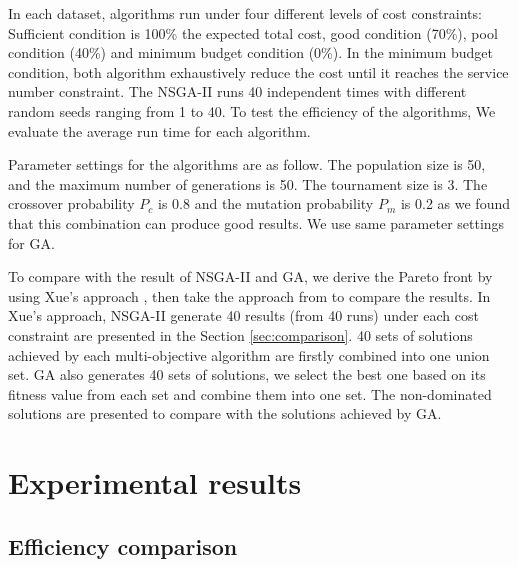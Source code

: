 \documentclass{llncs}
\begin{document}
In each dataset, algorithms run under four different levels of cost constraints: Sufficient condition is 100\% the expected total cost, 
good condition (70\%), pool condition (40\%) and minimum budget condition (0\%). In the minimum budget condition, 
both algorithm exhaustively reduce the cost until it reaches the service number constraint. The NSGA-II runs 40 independent times with different random 
seeds ranging from 1 to 40. To test the efficiency of the algorithms, We evaluate the average run time for each algorithm. 


Parameter settings for the algorithms are as follow. The population size is 50, and the maximum number of 
generations is 50. The tournament size is 3. 
The crossover probability $P_{c}$ is 0.8 and the mutation probability $P_{m}$ 
is 0.2 as we found that this combination can produce good results. We use same parameter settings for GA. 

To compare with the result of NSGA-II and GA, we derive the Pareto front by using Xue's approach \cite{Xue}, then take the approach from \cite{1688438} to compare the results.
In Xue's approach, NSGA-II generate 40 results (from 40 runs) under each cost constraint 
are presented in the Section \ref{sec:comparison}. 40 sets of solutions 
achieved by each multi-objective algorithm are firstly combined into one union set. GA also generates 40 sets of 
solutions, we select the best one based on its fitness value from each set and combine them into one set. 
The non-dominated solutions are presented to compare with the solutions achieved by GA.


\section{Experimental results}
\label{sec:results}
\subsection{Efficiency comparison}
\end{document}
